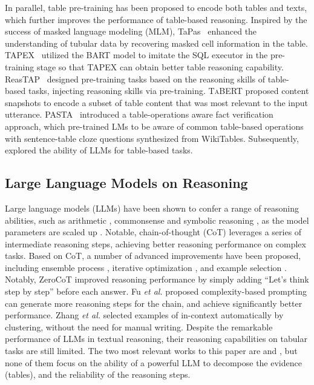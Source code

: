 In parallel, table pre-training has been proposed to encode both tables and texts, which further improves the performance of table-based reasoning. 
Inspired by the success of masked language modeling (MLM), TaPas~\citep{tapas} enhanced the understanding of tubular data by recovering masked cell information in the table. TAPEX~\citep{tapex} utilized the BART model to imitate the SQL executor in the pre-training stage so that TAPEX can obtain better table reasoning capability. ReasTAP~\citep{reastap} designed pre-training tasks based on the reasoning skills of table-based tasks, injecting reasoning skills via pre-training. 
\textsc{TaBERT} \citep{yin2020tabert} proposed content snapshots to encode a subset of table content that was most relevant to the input utterance. 
PASTA~\citep{pasta} introduced a table-operations aware
fact verification approach, which pre-trained LMs to be aware of common table-based operations with sentence-table cloze questions synthesized from WikiTables.
Subsequently, \citep{llmtab,binder} explored the ability of LLMs for table-based tasks.

\subsection{Large Language Models on Reasoning}
Large language models (LLMs) have been shown to confer a range of reasoning abilities, such as arithmetic \citep{lewkowycz2022solving}, commonsense \citep{liu2022rainier} and symbolic reasoning \citep{zhou2022least}, as the model parameters are scaled up \citep{gpt3}.
Notable, chain-of-thought (CoT) \citep{cot} leverages a series of intermediate reasoning steps, achieving better reasoning performance on complex tasks. 
Based on CoT, a number of advanced improvements have been proposed, including ensemble process \citep{cotsc}, iterative optimization \citep{zelikman2022star}, and example selection \citep{creswell2022selection}.
Notably, ZeroCoT \citep{zerocot} improved reasoning performance by simply adding ``Let's think step by step'' before each answer.
Fu \textit{et al.} \citep{fu2022complexity} proposed complexity-based prompting can generate more reasoning steps for the chain, and achieve significantly better performance.
Zhang \textit{et al.} \citep{zhang2022automatic} selected examples of in-context automatically by clustering, without the need for manual writing.
Despite the remarkable performance of LLMs in textual reasoning, their reasoning capabilities on tabular tasks are still limited.
The two most relevant works to this paper are  \citep{binder} and \citep{llmtab}, but none of them focus on the ability of a powerful LLM to decompose the evidence (tables), and the reliability of the reasoning steps.


